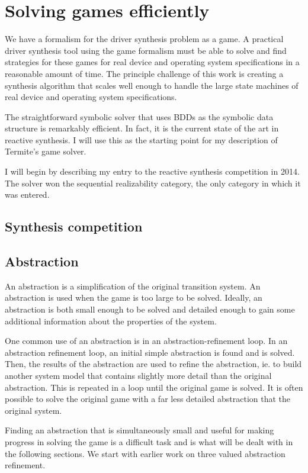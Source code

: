 \documentclass{book}
\theoremstyle{definition}
\begin{document}
\chapter{Solving games efficiently}

We have a formalism for the driver synthesis problem as a game. A practical driver synthesis tool using the game formalism must be able to solve and find strategies for these games for real device and operating system specifications in a reasonable amount of time. The principle challenge of this work is creating a synthesis algorithm that scales well enough to handle the large state machines of real device and operating system specifications. 

The straightforward symbolic solver that uses BDDs as the symbolic data structure is remarkably efficient. In fact, it is the current state of the art in reactive synthesis. I will use this as the starting point for my description of Termite's game solver.

I will begin by describing my entry to the reactive synthesis competition in 2014. The solver won the sequential realizability category, the only category in which it was entered.  

\section{Synthesis competition}



\section{Abstraction}
An abstraction is a simplification of the original transition system. An abstraction is used when the game is too large to be solved. Ideally, an abstraction is both small enough to be solved and detailed enough to gain some additional information about the properties of the system. 

One common use of an abstraction is in an abstraction-refinement loop. In an abstraction refinement loop, an initial simple abstraction is found and is solved. Then, the results of the abstraction are used to refine the abstraction, ie. to build another system model that contains slightly more detail than the original abstraction. This is repeated in a loop until the original game is solved. It is often possible to solve the original game with a far less detailed abstraction that the original system. 

Finding an abstraction that is simultaneously small and useful for making progress in solving the game is a difficult task and is what will be dealt with in the following sections. We start with earlier work on three valued abstraction refinement. 
\end{document}
